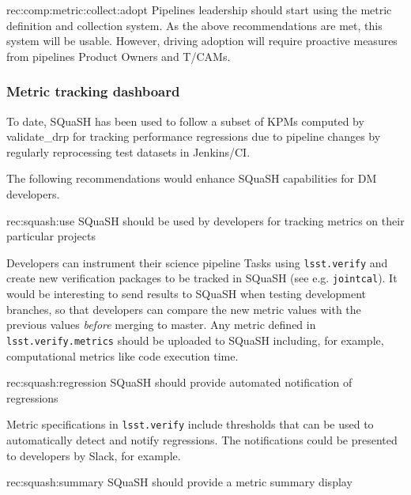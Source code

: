 \begin{recommendation}
    {rec:comp:metric:collect:adopt}
    {Pipelines leadership should start using the metric definition and collection system.}
    As the above recommendations are met, this system will be usable.
    However, driving adoption will require proactive measures from pipelines Product Owners and T/CAMs.
\end{recommendation}

\subsubsection{Metric tracking dashboard}
\label{sec:comp:metric:dashboard}

To date, SQuaSH has been used to follow a subset of KPMs computed by validate\_drp for tracking performance regressions due to pipeline changes by regularly reprocessing test datasets in Jenkins/CI.

The following recommendations would enhance SQuaSH capabilities for DM developers.

\begin{recommendation}
    {rec:squash:use}
    {SQuaSH should be used by developers for tracking metrics on their particular projects}
\end{recommendation}

Developers can instrument their science pipeline Tasks using \texttt{lsst.verify} and create new verification packages to be tracked in SQuaSH (see e.g. \texttt{jointcal}). It would be interesting to send results to SQuaSH when testing development branches, so that developers can compare the new metric values with the previous values \textit{before} merging to master. Any metric defined in \texttt{lsst.verify.metrics} should be uploaded to SQuaSH including, for example, computational metrics like code execution time.

\begin{recommendation}
    {rec:squash:regression}
    {SQuaSH should provide automated notification of regressions}
\end{recommendation}

Metric specifications in \texttt{lsst.verify} include thresholds that can be used to automatically detect and notify regressions. The notifications could be presented to developers by Slack, for example.

\begin{recommendation}
    {rec:squash:summary}
    {SQuaSH should provide a metric summary display}
\end{recommendation}

